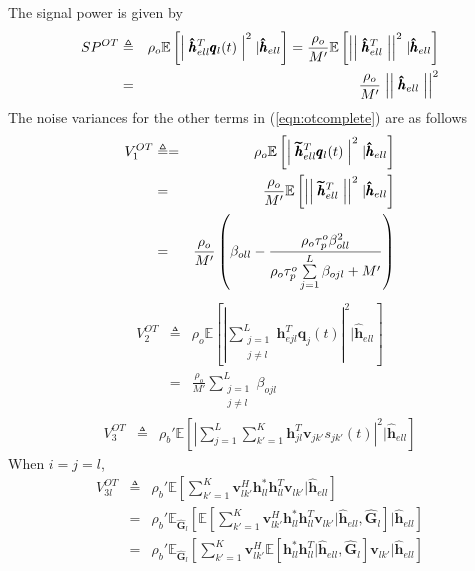 \documentclass[10pt, a4paper, twoside,fleqn]{article}
\begin{document}
The signal power is given by
\begin{eqnarray}
SP^{OT} &\triangleq& \rho_o\mathbb{E}\left[\Bigm|\pmb{\hat h}_{ell}^T \pmb{q}_l(t)\Bigm|^2 | \pmb{\hat h}_{ell}\right] = \frac{\rho_o}{M'}\mathbb{E}\left[\Bigm|\Bigm|\pmb{\hat h}^T_{ell}\Bigm|\Bigm|^2 | \pmb{\hat h}_{ell}\right] \nonumber \\    
         &=& \frac{\rho_o}{M'} \Bigm|\Bigm|\pmb{\hat h}_{ell}\Bigm|\Bigm|^2
\end{eqnarray}
The noise variances for the other terms in (\ref{eqn:otcomplete}) are as follows
\begin{eqnarray}\label{eqn:otv1}
	V_1^{OT} &\triangleq=& \rho_o\mathbb{E}\left[\Bigm|\pmb{\widetilde{h}}_{ell}^T \pmb{q}_l(t)\Bigm|^2|\pmb{\hat h}_{ell}\right] \nonumber \\
            &=& \frac{\rho_o}{M'} \mathbb{E}\left[\Bigm|\Bigm|\pmb{\widetilde{h}}^T_{ell}\Bigm|\Bigm|^2 |\pmb{\hat h}_{ell}\right] \nonumber \\
            &=& \frac{\rho_o}{M'}\left(\beta_{oll}-\frac{\rho_o\tau_p^o\beta^2_{oll}}{\rho_o\tau_p^o\sum\limits_{j=1}^{L}\beta_{ojl}+M'}\right)          
\end{eqnarray}
\begin{eqnarray}\label{eqn:otv2}
	V_2^{OT} &\triangleq& \rho_o \mathbb{E}\left[\left\vert\sum_{\substack{j=1 \\ j \neq l}}^{L} \pmb{h}^T_{ejl} \pmb{q}_j(t)\right\vert^2|\pmb{\hat h}_{ell}\right] \nonumber \\
            &=& \frac{\rho_o}{M'} \sum_{\substack{j=1 \\ j\neq l}}^{L} \beta_{ojl}
\end{eqnarray}
\begin{eqnarray}\label{eqn:v3ot}
	V_3^{OT} &\triangleq& \rho_b' \mathbb{E}\left[\left| \sum_{j=1}^{L}\sum_{k'=1}^{K} \pmb{h}^T_{jl} \pmb{v}_{jk'}s_{jk'}(t) \right|^2 | \pmb{\hat h}_{ell} \right] 
\end{eqnarray}
When $i=j=l$,
\begin{eqnarray}
     V_{3l}^{OT} &\triangleq& \rho_b' \mathbb{E}\left[\sum_{k'=1}^{K} \pmb{v}_{lk'}^H \pmb{h}_{ll}^*  \pmb{h}_{ll}^T\pmb{v}_{lk'}| \pmb{\hat h}_{ell} \right] \nonumber \\
            &=& \rho_b' \mathbb{E}_{\pmb{\widehat{G}}_l}\left[\mathbb{E}\left[\sum_{k'=1}^{K} \pmb{v}^H_{lk'} \pmb{h}_{ll}^* \pmb{h}_{ll}^T \pmb{v}_{lk'}| \pmb{\hat h}_{ell},  \pmb{\widehat{G}}_{l} \right] | \pmb{\hat h}_{ell}\right] \nonumber \\
            &=& \rho_b' \mathbb{E}_{\pmb{\widehat{G}}_l}\left[\sum_{k'=1}^{K}\pmb{v}^H_{lk'} \mathbb{E}\left[ \pmb{h}_{ll}^*  \pmb{h}^T_{ll} | \pmb{\hat h}_{ell},  \pmb{\widehat{G}}_{l} \right] \pmb{v}_{lk'}| \pmb{\hat h}_{ell}\right]
\end{eqnarray}
\end{document}
